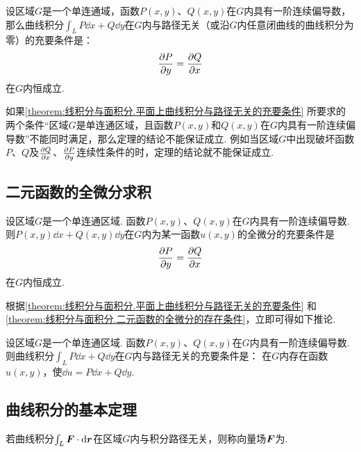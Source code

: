 \begin{theorem}\label{theorem:线积分与面积分.平面上曲线积分与路径无关的充要条件}
设区域\(G\)是一个单连通域，函数\(P(x,y)\)、\(Q(x,y)\)在\(G\)内具有一阶连续偏导数，那么曲线积分\(\int_L P\dd{x}+Q\dd{y}\)在\(G\)内与路径无关（或沿\(G\)内任意闭曲线的曲线积分为零）的充要条件是：\[
\pdv{P}{y}=\pdv{Q}{x}
\]在\(G\)内恒成立.
\end{theorem}
如果\cref{theorem:线积分与面积分.平面上曲线积分与路径无关的充要条件} 所要求的两个条件“区域\(G\)是单连通区域，且函数\(P(x,y)\)和\(Q(x,y)\)在\(G\)内具有一阶连续偏导数”不能同时满足，那么定理的结论不能保证成立.
例如当区域\(G\)中出现破坏函数\(P\)、\(Q\)及\(\pdv{Q}{x}\)、\(\pdv{P}{y}\)连续性条件的时，定理的结论就不能保证成立.

\subsection{二元函数的全微分求积}
\begin{theorem}\label{theorem:线积分与面积分.二元函数的全微分的存在条件}
设区域\(G\)是一个单连通区域.
函数\(P(x,y)\)、\(Q(x,y)\)在\(G\)内具有一阶连续偏导数.
则\(P(x,y)\dd{x}+Q(x,y)\dd{y}\)在\(G\)内为某一函数\(u(x,y)\)的全微分的充要条件是\[
\pdv{P}{y}=\pdv{Q}{x}
\]在\(G\)内恒成立.
\end{theorem}

根据\cref{theorem:线积分与面积分.平面上曲线积分与路径无关的充要条件} 和\cref{theorem:线积分与面积分.二元函数的全微分的存在条件}，立即可得如下推论.
\begin{corollary}
设区域\(G\)是一个单连通区域.
函数\(P(x,y)\)、\(Q(x,y)\)在\(G\)内具有一阶连续偏导数.
则曲线积分\(\int_L{P\dd{x}+Q\dd{y}}\)在\(G\)内与路径无关的充要条件是：
在\(G\)内存在函数\(u(x,y)\)，使\(\dd{u}=P\dd{x}+Q\dd{y}\).
\end{corollary}

\subsection{曲线积分的基本定理}
\begin{definition}
若曲线积分\(\int_L \boldsymbol{F}\cdot\dd{\boldsymbol{r}}\)在区域\(G\)内与积分路径无关，则称向量场\(\boldsymbol{F}\)为.
\end{definition}

